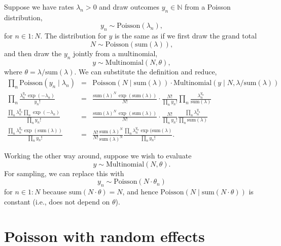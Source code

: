 \documentclass[11pt]{report}
\newcommand{\rngto}[1]{1{:}#1}
\begin{document}
Suppose we have rates $\lambda_n > 0$ and draw outcomes $y_n \in
\mathbb{N}$ from a Poisson distribution,%
%
\[
  y_n \sim \textrm{Poisson}(\lambda_n),
\]
%
for $n \in \rngto{N}$. The distribution for $y$ is the same as if we
first draw the grand total
%
\[
  N \sim \textrm{Poisson}(\textrm{sum}(\lambda)),
\]
%
and then draw the $y_n$ jointly from a multinomial,%
%
\[
  y \sim \textrm{Multinomial}(N, \theta),
\]
%
where $\theta = \lambda / \textrm{sum}(\lambda)$.  We can substitute
the definition and reduce,
%
{\small
\begin{eqnarray*}
    \prod_n \textrm{Poisson}(y_n \mid \lambda_n)
    & = & \textrm{Poisson}(N \mid \textrm{sum}(\lambda))
          \cdot \textrm{Multinomial}(y \mid N, \lambda / \textrm{sum}(\lambda))
    \\[3pt]
    \prod_n \frac{\lambda_n^{y_n} \exp(-\lambda_n)}{y_n!}
    & = &
          \frac{\textrm{sum}(\lambda)^N \, \exp(\textrm{sum}(\lambda))}{N!}
          \cdot
          \frac{N!}{\prod_n y_n!}
          \prod_n \frac{\lambda_n^{y_n}}{\textrm{sum}(\lambda)}
    \\[3pt]
    \frac{\prod_n \lambda_n^{y_n} \prod_n \exp(-\lambda_n)}{\prod_n y_n!}
    & = &
          \frac{\textrm{sum}(\lambda)^N \, \exp(\textrm{sum}(\lambda))}{N!}
          \cdot
          \frac{N!}{\prod_n y_n!}
          \frac{\prod_n \lambda_n^{y_n}}{\prod_n \textrm{sum}(\lambda)}
    \\[3pt]
    \frac{\prod_n \lambda_n^{y_n} \exp(\textrm{sum}(\lambda))}{\prod_n y_n!}
    & = &
          \frac{N!}{N!}
          \frac{\textrm{sum}(\lambda)^N}{\textrm{sum}(\lambda)^N}
          \frac{\prod_n \lambda_n^{y_n} \exp(\textrm{sum}(\lambda)}{\prod_n y_n!}.
\end{eqnarray*}
}

Working the other way around, suppose we wish to evaluate
\[
  y \sim \textrm{Multinomial}(N, \theta).
\]
For sampling, we can replace this with
\[
  y_n \sim \textrm{Poisson}(N \cdot \theta_n)
\]
for $n \in \rngto{N}$ because $\textrm{sum}(N \cdot \theta) = N$, and
hence $\textrm{Poisson}(N \mid \textrm{sum}(N \cdot \theta))$ is
constant (i.e., does not depend on $\theta$).


\section{Poisson with random effects}
\end{document}
